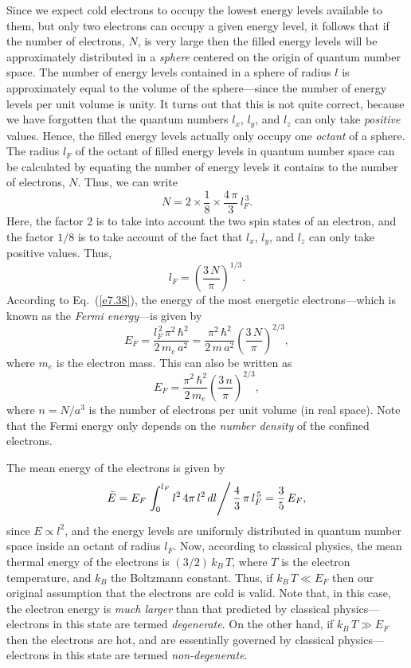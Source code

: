 Since we expect cold electrons to occupy the lowest  energy levels
available to them, but only two electrons can occupy a given energy
level, it follows that if the number of electrons, $N$, is very large then
the filled energy levels will be approximately distributed in a {\em sphere}\/ centered
on the origin of quantum number space. The number of energy levels contained in a sphere
of radius $l$ is approximately equal to the volume of the sphere---since
the number of energy levels per unit volume is unity. It turns out that this
is not quite correct, because we have forgotten that the quantum numbers
$l_x$, $l_y$, and $l_z$ can only take {\em positive}\/ values.
Hence, the filled energy levels actually only occupy one {\em octant}\/ of a sphere.
The radius $l_F$ of the octant of filled energy levels in quantum number space can be calculated
by equating the number of energy levels it contains to the number of electrons,
$N$.
Thus, we can write
\begin{equation}
N = 2\times\frac{1}{8}\times \frac{4\,\pi}{3}\,l_F^{\,3}.
\end{equation}
Here, the factor 2 is to take into account the two spin states of an electron,
and the factor $1/8$ is to take account of the fact that $l_x$, $l_y$, and $l_z$
can only take positive values.
Thus,
\begin{equation}
l_F = \left(\frac{3\,N}{\pi}\right)^{1/3}.
\end{equation}
According to Eq.~(\ref{e7.38}), the energy of the most energetic
electrons---which is known as the {\em Fermi energy}---is given by
\begin{equation}\label{e7.42}
E_F = \frac{l_F^{\,2}\,\pi^2\,\hbar^2}{2\,m_e\,a^2}=\frac{\pi^2\,\hbar^2}{2\,m\,a^2}\left(\frac{3\,N}{\pi}\right)^{2/3},
\end{equation}
where $m_e$ is the electron mass.
This can also be written as
\begin{equation}\label{e7.43}
E_F = \frac{\pi^2\,\hbar^2}{2\,m_e}\left(\frac{3\,n}{\pi}\right)^{2/3},
\end{equation}
where $n=N/a^3$ is the number of electrons per unit volume (in real space). Note
that the Fermi energy only depends on the {\em number density}\/
of the confined electrons. 

The mean energy of the electrons is given by
\begin{equation}
\bar{E} = E_F\left.\int_0^{l_F}l^2\,4\pi\,l^2\,dl\right/\frac{4}{3}\,\pi\,l_F^{\,5}=
\frac{3}{5}\,E_F,
\end{equation}
since $E\propto l^2$, and the energy levels are uniformly
distributed in quantum number space inside an octant of radius $l_F$. Now, according to classical physics, the mean
thermal energy of the electrons is $(3/2)\,k_B\,T$, where $T$ is the
electron temperature, and $k_B$  the
Boltzmann constant. Thus, if $k_B\,T\ll E_F$ then our original assumption
that the electrons are cold is valid. Note that, in this case, the
electron energy is {\em much larger}\/ than that predicted by classical
physics---electrons in this state are termed {\em degenerate}. On the
other hand, if $k_B\,T\gg E_F$ then the electrons are hot, and are essentially
governed by classical physics---electrons in this state are termed {\em non-degenerate}.

